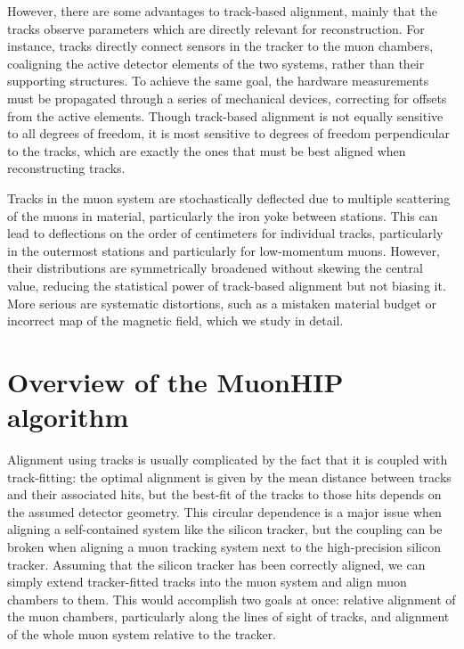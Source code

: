 \documentclass[12pt]{article}
\begin{document}
However, there are some advantages to track-based alignment, mainly
that the tracks observe parameters which are directly relevant for
reconstruction.  For instance, tracks directly connect sensors in the
tracker to the muon chambers, coaligning the active detector elements
of the two systems, rather than their supporting structures.  To
achieve the same goal, the hardware measurements must be propagated
through a series of mechanical devices, correcting for offsets from
the active elements.  Though track-based alignment is not equally
sensitive to all degrees of freedom, it is most sensitive to degrees
of freedom perpendicular to the tracks, which are exactly the ones
that must be best aligned when reconstructing tracks.

Tracks in the muon system are stochastically deflected due to multiple
scattering of the muons in material, particularly the iron yoke
between stations.  This can lead to deflections on the order of
centimeters for individual tracks, particularly in the outermost
stations and particularly for low-momentum muons.  However, their
distributions are symmetrically broadened without skewing the central
value, reducing the statistical power of track-based alignment but not
biasing it.  More serious are systematic distortions, such as a
mistaken material budget or incorrect map of the magnetic field, which
we study in detail.

\section{Overview of the MuonHIP algorithm}

Alignment using tracks is usually complicated by the fact that it is
coupled with track-fitting: the optimal alignment is given by the mean
distance between tracks and their associated hits, but the best-fit of
the tracks to those hits depends on the assumed detector geometry.
This circular dependence is a major issue when aligning a
self-contained system like the silicon tracker, but the coupling can
be broken when aligning a muon tracking system next to the
high-precision silicon tracker.  Assuming that the silicon tracker has
been correctly aligned, we can simply extend tracker-fitted tracks
into the muon system and align muon chambers to them.  This would
accomplish two goals at once: relative alignment of the muon chambers,
particularly along the lines of sight of tracks, and alignment of the
whole muon system relative to the tracker.
\end{document}
